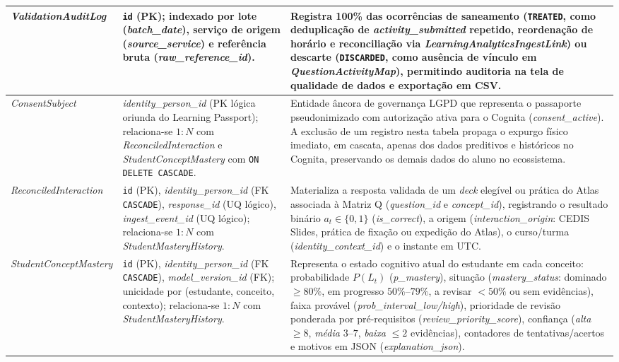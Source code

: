 {\begin{longtable}{>{\raggedright\arraybackslash}p{3.4cm}>{\raggedright\arraybackslash}p{4.2cm}>{\raggedright\arraybackslash}p{6.2cm}}
\hline
\textit{ValidationAudit\allowbreak Log} & \texttt{id} (PK); indexado por lote (\textit{batch\_date}), serviço de origem (\textit{source\_service}) e referência bruta (\textit{raw\_reference\_id}). & Registra 100\% das ocorrências de saneamento (\texttt{TREATED}, como deduplicação de \textit{activity\_submitted} repetido, reordenação de horário e reconciliação via \textit{LearningAnalyticsIngestLink}) ou descarte (\texttt{DISCARDED}, como ausência de vínculo em \textit{QuestionActivityMap}), permitindo auditoria na tela de qualidade de dados e exportação em CSV. \\
\hline
\textit{ConsentSubject} & \textit{identity\_person\_id} (PK lógica oriunda do Learning Passport); relaciona-se $1:N$ com \textit{ReconciledInteraction} e \textit{StudentConceptMastery} com \texttt{ON DELETE CASCADE}. & Entidade âncora de governança LGPD que representa o passaporte pseudonimizado com autorização ativa para o Cognita (\textit{consent\_active}). A exclusão de um registro nesta tabela propaga o expurgo físico imediato, em cascata, apenas dos dados preditivos e históricos no Cognita, preservando os demais dados do aluno no ecossistema. \\
\hline
\textit{Reconciled\allowbreak Interaction} & \texttt{id} (PK), \textit{identity\_person\_id} (FK \texttt{CASCADE}), \textit{response\_id} (UQ lógico), \textit{ingest\_event\_id} (UQ lógico); relaciona-se $1:N$ com \textit{StudentMasteryHistory}. & Materializa a resposta validada de um \textit{deck} elegível ou prática do Atlas associada à Matriz Q (\textit{question\_id} e \textit{concept\_id}), registrando o resultado binário $a_t \in \{0, 1\}$ (\textit{is\_correct}), a origem (\textit{interaction\_origin}: CEDIS Slides, prática de fixação ou expedição do Atlas), o curso/turma (\textit{identity\_context\_id}) e o instante em UTC. \\
\hline
\textit{StudentConcept\allowbreak Mastery} & \texttt{id} (PK), \textit{identity\_person\_id} (FK \texttt{CASCADE}), \textit{model\_version\_id} (FK); unicidade por (estudante, conceito, contexto); relaciona-se $1:N$ com \textit{StudentMasteryHistory}. & Representa o estado cognitivo atual do estudante em cada conceito: probabilidade $P(L_t)$ (\textit{p\_mastery}), situação (\textit{mastery\_status}: dominado $\ge 80\%$, em progresso $50\%$--$79\%$, a revisar $< 50\%$ ou sem evidências), faixa provável (\textit{prob\_interval\_low/high}), prioridade de revisão ponderada por pré-requisitos (\textit{review\_priority\_score}), confiança (\textit{alta} $\ge 8$, \textit{média} $3$--$7$, \textit{baixa} $\le 2$ evidências), contadores de tentativas/acertos e motivos em JSON (\textit{explanation\_json}). \\

\end{longtable}}

